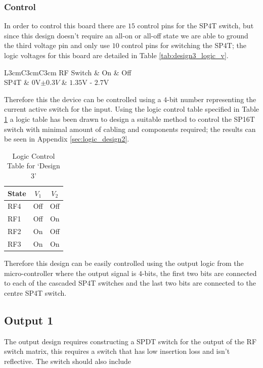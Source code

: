 \documentclass[12pt,openany,a4paper]{book}
\begin{document}
\subsubsection{Control}
In order to control this  board there are $15$ control pins for the SP4T switch, but since this design doesn't require an all-on or all-off state we are able to ground the third voltage pin and only use $10$ control pins for switching the SP4T; the logic voltages for this board are detailed in Table \ref{tab:design3_logic_v}.
\begin{table}[H]
	\centering
	\begin{tabular}{L{3cm}C{3cm}C{3cm}}
	\hline
	RF Switch & On & Off\\
	\hline
	SP4T & $0$V$\pm 0.3V$ & $1.35$V - $2.7$V \\
	\hline	
	\end{tabular}
	\caption{Logic Voltage Control}
	\label{tab:design3_logic_v}
\end{table}
Therefore this the device can be controlled using a $4$-bit number representing the current active switch for the input. Using the logic control table specified in Table \ref{tab:logic-cont-design3} a logic table has been drawn to design a suitable method to control the SP16T switch with minimal amount of cabling and components required; the results can be seen in Appendix \ref{sec:logic_design2}. 
\begin{table}[H]
	\centering
	\begin{tabular}{l c c }
		\hline
		State & $V_1$ & $V_2$\\
		\hline
		RF4 & Off & Off \\
		RF1 & Off & On \\
		RF2 & On & Off\\
		RF3 & On & On	\\	
		\hline
	\end{tabular}
    \caption{Logic Control Table for `Design 3'} \label{tab:logic-cont-design3}
\end{table}
Therefore this design can be easily controlled using the output logic from the micro-controller where the output signal is $4$-bits, the first two bits are connected to each of the cascaded SP4T switches and the last two bits are connected to the centre SP4T switch.


\subsection{Output 1}		\label{sec:output1}
The output design requires constructing a SPDT switch for the output of the RF switch matrix, this requires a switch that has low insertion loss and isn't reflective. The switch should also include 
\end{document}
